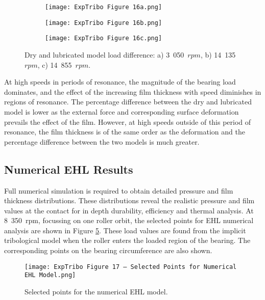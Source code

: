 \begin{figure}[h!]
	\centering
	\begin{subfigure}{0.75\textwidth}
		\centering
		\texttt{[image: ExpTribo Figure 16a.png]}
		\caption{}
		\label{3050rpm}
	\end{subfigure}
	\hfill
	\begin{subfigure}{0.75\textwidth}
		\centering
		\texttt{[image: ExpTribo Figure 16b.png]}
		\caption{}
		\label{14135rpm}
	\end{subfigure}
	\vfill
	\begin{subfigure}{0.75\textwidth}
		\centering
		\texttt{[image: ExpTribo Figure 16c.png]}
		\caption{}
		\label{14855rpm}
	\end{subfigure}
	\caption{Dry and lubricated model load difference: a) 3~050~$rpm$, b) 14~135~$rpm$, c) 14~855~$rpm$.}
	\label{Dry and lubricated model load difference}
\end{figure}

At high speeds in periods of resonance, the magnitude of the bearing load dominates, and the effect of the increasing film thickness with speed diminishes in regions of resonance. The percentage difference between the dry and lubricated model is lower as the external force and corresponding surface deformation prevails the effect of the film. However, at high speeds outside of this period of resonance, the film thickness is of the same order as the deformation and the percentage difference between the two models is much greater.  

\subsection{Numerical EHL Results}

Full numerical simulation is required to obtain detailed pressure and film thickness distributions. These distributions reveal the realistic pressure and film values at the contact for in depth durability, efficiency and thermal analysis. At 8~350~rpm, focussing on one roller orbit, the selected points for EHL numerical analysis are shown in Figure \ref{Selected points for the numerical EHL model}. These load values are found from the implicit tribological model when the roller enters the loaded region of the bearing. The corresponding points on the bearing circumference are also shown. 

\begin{figure}
	\texttt{[image: ExpTribo Figure 17 – Selected Points for Numerical EHL Model.png]}
	\caption{Selected points for the numerical EHL model.}
	\label{Selected points for the numerical EHL model}
\end{figure} 

